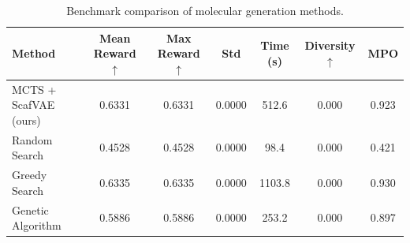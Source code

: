 \begin{table}[htbp]
\centering
\caption{Benchmark comparison of molecular generation methods.}
\label{tab:p4_benchmark}
\begin{tabular}{lcccccc}
\toprule
Method & Mean Reward $\uparrow$ & Max Reward $\uparrow$ & Std & Time (s) & Diversity $\uparrow$ & MPO \\
\midrule
  MCTS + ScafVAE (ours) & 0.6331 & 0.6331 & 0.0000 & 512.6 & 0.000 & 0.923 \\
  Random Search & 0.4528 & 0.4528 & 0.0000 & 98.4 & 0.000 & 0.421 \\
  Greedy Search & 0.6335 & 0.6335 & 0.0000 & 1103.8 & 0.000 & 0.930 \\
  Genetic Algorithm & 0.5886 & 0.5886 & 0.0000 & 253.2 & 0.000 & 0.897 \\
\bottomrule
\end{tabular}
\end{table}

